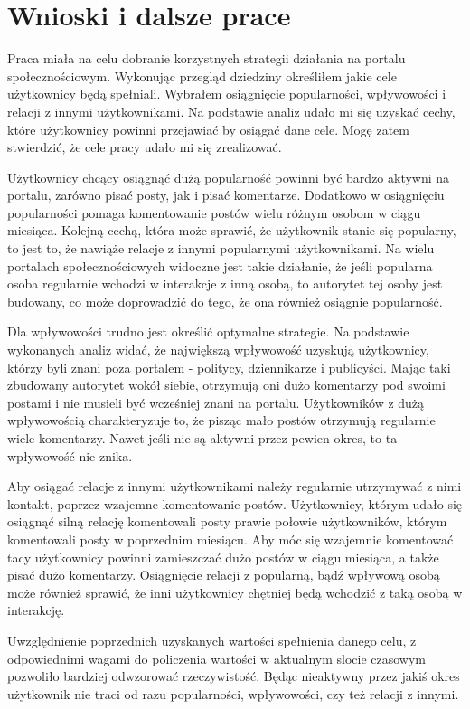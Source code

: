 \documentclass[polish,12pt]{aghthesis}
\begin{document}
\newpage
\section{Wnioski i dalsze prace}

Praca miała na celu dobranie korzystnych strategii działania na portalu społecznościowym. Wykonując przegląd dziedziny określiłem jakie cele użytkownicy będą spełniali. Wybrałem osiągnięcie popularności, wpływowości i relacji z innymi użytkownikami. Na podstawie analiz udało mi się uzyskać cechy, które użytkownicy powinni przejawiać by osiągać dane cele. Mogę zatem stwierdzić, że cele pracy udało mi się zrealizować.

Użytkownicy chcący osiągnąć dużą popularność powinni być bardzo aktywni na portalu, zarówno pisać posty, jak i pisać komentarze. Dodatkowo w osiągnięciu popularności pomaga komentowanie postów wielu różnym osobom w ciągu miesiąca. Kolejną cechą, która może sprawić, że użytkownik stanie się popularny, to jest to, że nawiąże relacje z innymi popularnymi użytkownikami. Na wielu portalach społecznościowych widoczne jest takie działanie, że jeśli popularna osoba regularnie wchodzi w interakcje z inną osobą, to autorytet tej osoby jest budowany, co może doprowadzić do tego, że ona również osiągnie popularność.

Dla wpływowości trudno jest określić optymalne strategie. Na podstawie wykonanych analiz widać, że największą wpływowość uzyskują użytkownicy, którzy byli znani poza portalem - politycy, dziennikarze i publicyści. Mając taki zbudowany autorytet wokół siebie, otrzymują oni dużo komentarzy pod swoimi postami i nie musieli być wcześniej znani na portalu. Użytkowników z dużą wpływowością charakteryzuje to, że pisząc mało postów otrzymują regularnie wiele komentarzy. Nawet jeśli nie są aktywni przez pewien okres, to ta wpływowość nie znika.

Aby osiągać relacje z innymi użytkownikami należy regularnie utrzymywać z nimi kontakt, poprzez wzajemne komentowanie postów. Użytkownicy, którym udało się osiągnąć silną relację komentowali posty prawie połowie użytkowników, którym komentowali posty w poprzednim miesiącu. Aby móc się wzajemnie komentować tacy użytkownicy powinni zamieszczać dużo postów w ciągu miesiąca, a także pisać dużo komentarzy. Osiągnięcie relacji z popularną, bądź wpływową osobą może również sprawić, że inni użytkownicy chętniej będą wchodzić z taką osobą w interakcję.

Uwzględnienie poprzednich uzyskanych wartości spełnienia danego celu, z odpowiednimi wagami do policzenia wartości w aktualnym slocie czasowym pozwoliło bardziej odwzorować rzeczywistość. Będąc nieaktywny przez jakiś okres użytkownik nie traci od razu popularności, wpływowości, czy też relacji z innymi. 
\end{document}
